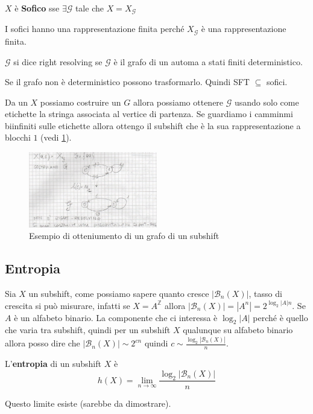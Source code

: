 \begin{definizione}
    $X$ è \textbf{Sofico} sse $\exists \mathcal{G}$ tale che $X= X_\mathcal{G}$
\end{definizione}

I sofici hanno una rappresentazione finita perché $X_\mathcal{G}$ è una rappresentazione
finita.

\begin{definizione}
    $\mathcal{G}$ si dice right resolving se $\mathcal{G}$ è il
    grafo di un automa a stati finiti deterministico.
\end{definizione}

Se il grafo non è deterministico possono trasformarlo. Quindi SFT $\subseteq$ sofici.

Da un $X$ possiamo costruire un $G$ allora possiamo ottenere $\mathcal{G}$ usando solo
come etichette la stringa associata al vertice di partenza. Se guardiamo i camminmi biinfiniti sulle
etichette allora ottengo il subshift che è la sua rappresentazione a blocchi $1$ (vedi \ref{fig:subshift}).

\begin{figure}[!h]
    \centering
    \includegraphics[width=0.5\textwidth]{img/sistemi_complessi/subshift_e_grafi.png}
    \caption{Esempio di otteniumento di un grafo di un subshift}
    \label{fig:subshift}
\end{figure}

\subsection{Entropia}
Sia $X$ un subshift, come possiamo sapere quanto cresce $|\mathcal{B}_n(X)|$, tasso
di crescita si può misurare, infatti se $X=A^\mathbb{Z}$ allora $|\mathcal{B}_n(X)|=|A^n|= 2^{\log_2|A|n}$.
Se $A$ è un alfabeto binario. La componente che ci interessa è $\log_2 |A|$ perché
è quello che varia tra subshift, quindi per un subshift $X$ qualunque su alfabeto binario
allora posso dire che $|\mathcal{B}_n(X)| \sim 2^{cn}$ quindi $c\sim \frac{\log_2|\mathcal{B}_n(X)|}{n}$.

\begin{definizione}
    L'\textbf{entropia} di un subshift $X$ è
    $$h(X) = \lim_{n\to \infty}\frac{\log_2|\mathcal{B}_n(X)|}{n}$$
\end{definizione}
Questo limite esiste (sarebbe da dimostrare).


